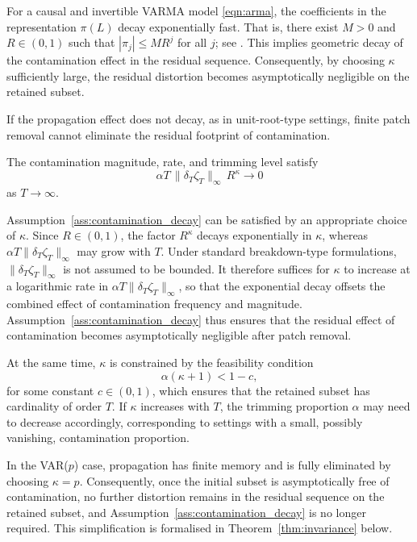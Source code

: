 \documentclass[12pt]{article}
\numberwithin{equation}{section}
\begin{document}
For a causal and invertible VARMA model \eqref{eqn:arma}, the coefficients in the representation $\pi(L)$ decay exponentially fast. 
That is, there exist $M>0$ and $R\in(0,1)$ such that $|\pi_j|\le M R^j$ for all $j$; see \citet[Theorem 11.3.2]{brockwell_time_1991}. 
This implies geometric decay of the contamination effect in the residual sequence. 
Consequently, by choosing $\kappa$ sufficiently large, the residual distortion becomes asymptotically negligible on the retained subset.

If the propagation effect does not decay, as in unit-root-type settings, finite patch removal cannot eliminate the residual footprint of contamination.

\begin{assumption}\label{ass:contamination_decay}
The contamination magnitude, rate, and trimming level satisfy
\begin{equation}\label{eqn:kappa-condition}
\alpha T \,\|\delta_T \zeta_T\|_\infty \, R^\kappa \longrightarrow 0
\end{equation}
as $T \to \infty$.
\end{assumption}

Assumption~\ref{ass:contamination_decay} can be satisfied by an appropriate choice of $\kappa$. 
Since $R\in(0,1)$, the factor $R^\kappa$ decays exponentially in $\kappa$, whereas $\alpha T\|\delta_T\zeta_T\|_\infty$ may grow with $T$. 
Under standard breakdown-type formulations, $\|\delta_T \zeta_T\|_\infty$ is not assumed to be bounded. 
It therefore suffices for $\kappa$ to increase at a logarithmic rate in $\alpha T\|\delta_T\zeta_T\|_\infty$, so that the exponential decay offsets the combined effect of contamination frequency and magnitude. 
Assumption~\ref{ass:contamination_decay} thus ensures that the residual effect of contamination becomes asymptotically negligible after patch removal.

At the same time, $\kappa$ is constrained by the feasibility condition
\begin{equation}
\alpha(\kappa+1) < 1-c,
\end{equation}
for some constant $c\in(0,1)$, which ensures that the retained subset has cardinality of order $T$. 
If $\kappa$ increases with $T$, the trimming proportion $\alpha$ may need to decrease accordingly, corresponding to settings with a small, possibly vanishing, contamination proportion.

In the VAR($p$) case, propagation has finite memory and is fully eliminated by choosing $\kappa=p$. 
Consequently, once the initial subset is asymptotically free of contamination, no further distortion remains in the residual sequence on the retained subset, and Assumption~\ref{ass:contamination_decay} is no longer required. 
This simplification is formalised in Theorem~\ref{thm:invariance} below.
\end{document}
